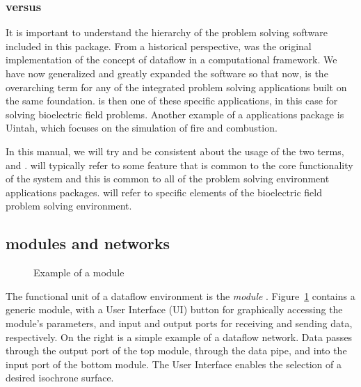\subsubsection{\SR{} versus \PSE{}}

It is important to understand the hierarchy of the problem solving software
included in this package.  From a historical perspective, \SR{} was the
original implementation of the concept of dataflow in a computational
framework\cite{CRJ:Joh94c,RSM:Par95,RSM:Par95b,RSM:Par97,RSM:Par97b,CRJ:Parker99b}.
We have now generalized and greatly expanded the \SR{} software so that
now, \SR{} is the overarching term for any of the integrated problem
solving applications built on the same foundation.  \PSE{} is then one of
these specific  applications, in this case for solving bioelectric field
problems.  Another example of a \SR{} applications package is
Uintah\cite{RSM:Dav2000}, which focuses on the simulation of fire and
combustion. 

In this manual, we will try and be consistent about the usage of the two
terms, \SR{} and \PSE{}.  \SR{} will typically refer to some feature that
is common to the core functionality of the system and this is common to all
of the problem solving environment applications packages.  \PSE{} will
refer to specific elements of the bioelectric field problem solving
environment.


\subsection{\SR{} modules and networks}
\label{sec:con-modules} 


\begin{figure}[htb]
  \begin{makeimage}
  \end{makeimage}
  \basicmodule
  \caption{\label{fig:conc-module} Example of a \SR{} module}
\end{figure}

The functional unit of a dataflow environment is the {\em\/module}
 .  Figure~\ref{fig:conc-module} contains a generic \SR{}
module, with a User Interface (UI) button for graphically accessing the
module's parameters, and input and output ports for receiving and sending
data, respectively.  On the right is a simple example of a dataflow
network.  Data passes through the output port of the top module, through
the data pipe, and into the input port of the bottom module.  The User
Interface enables the selection of a desired isochrone surface.

